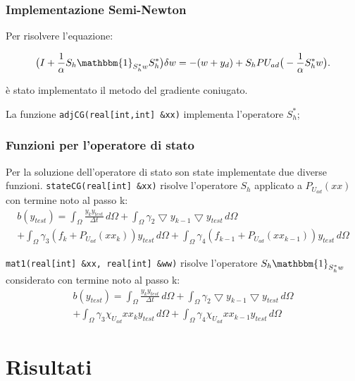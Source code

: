 \documentclass{beamer}
\theoremstyle{definition}
\theoremstyle{remark}
\theoremstyle{plain}
\theoremstyle{definition}
\begin{document}
\begin{frame}
\frametitle{Implementazione Semi-Newton}
Per risolvere l'equazione:

\begin{equation*}
\big( I + \frac{1}{\alpha}S_h\mathbbm{1}_{S^*_hw}S^*_h\big)\delta w=-(w+y_d)+S_hP{U_{ad}}\big( -\frac{1}{\alpha}S^*_hw\big).
\end{equation*}

è stato implementato il metodo del gradiente coniugato.
\par\bigskip
La funzione \texttt{adjCG(real[int,int] \&xx)} implementa l’operatore $S_h^*$; 

\end{frame}

\begin{frame}
\frametitle{Funzioni per l'operatore di stato}
Per la soluzione dell'operatore di stato son state implementate due diverse funzioni.
\texttt{stateCG(real[int] \&xx)} risolve l'operatore $S_h$ applicato a $P_{U_{ad}}(xx)$ con termine noto al passo k:
\begin{multline*}
b(y_{test}) = \int_{\Omega} \frac{y_ky_{test}}{{\Delta}t} \, d\Omega + \int_{\Omega} \gamma_2 \bigtriangledown y_{k-1} \bigtriangledown y_{test} \, d\Omega \\+ \int_{\Omega} \gamma_3 (f_{k}+P_{U_{ad}}(xx_k))y_{test} \, d\Omega + \int_{\Omega} \gamma_4 (f_{k-1}+P_{U_{ad}}(xx_{k-1}))y_{test} \, d\Omega
\end{multline*}

\texttt{mat1(real[int] \&xx, real[int] \&ww)} risolve l'operatore $S_h\mathbbm{1}_{S^*_hw}$ considerato con termine noto al passo k:
\begin{multline*}
b(y_{test}) = \int_{\Omega} \frac{y_ky_{test}}{{\Delta}t} \, d\Omega + \int_{\Omega} \gamma_2 \bigtriangledown y_{k-1} \bigtriangledown y_{test} \, d\Omega \\+ \int_{\Omega} \gamma_3 \chi_{U_{ad}}xx_k y_{test} \, d\Omega + \int_{\Omega} \gamma_4 \chi_{U_{ad}}xx_{k-1} y_{test} \, d\Omega
\end{multline*}

\end{frame}

\section{Risultati}
\end{document}
